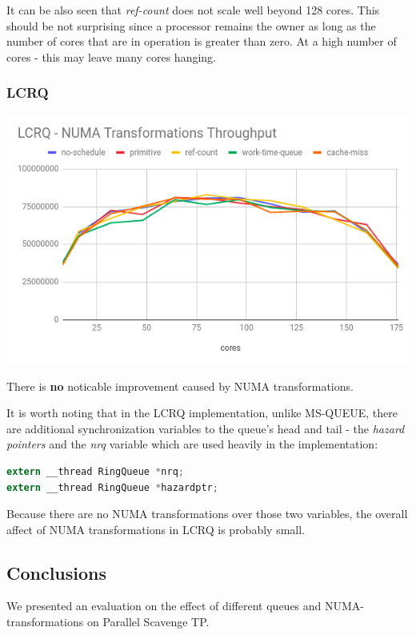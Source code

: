\documentclass{article}
\begin{document}
 It can be also seen that \textit{ref-count} does not scale well beyond 128 cores. This should be not surprising since a processor remains the owner as long as the number of cores that are in operation is greater than zero. At a high number of cores - this may leave many cores hanging.


 \subsubsection{LCRQ}

 \includegraphics[width=\textwidth]{graph-lcrq.png}

 There is \textbf{no} noticable improvement caused by NUMA transformations. 
 
 It is worth noting that in the LCRQ implementation, unlike MS-QUEUE, there are additional synchronization variables to the queue's head and tail - the \textit{hazard pointers} and the \textit{nrq} variable which are used heavily in the implementation:

 \begin{lstlisting}[language=C]
extern __thread RingQueue *nrq;
extern __thread RingQueue *hazardptr;
 \end{lstlisting}

 Because there are no NUMA transformations over those two variables, the overall affect of NUMA transformations in LCRQ is probably small.

 \subsection{Conclusions}

 We presented an evaluation on the effect of different queues and NUMA-transformations on Parallel Scavenge TP. 
 
\end{document}
